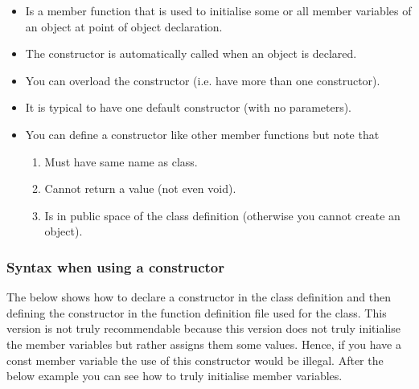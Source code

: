 \begin{itemize}
	\item Is a member function that is used to initialise some or all member variables
	of an object at point of object declaration.
	\item The constructor is automatically called when an object is declared.
	\item You can overload the constructor (i.e. have more than one constructor).
	\item It is typical to have one default constructor (with no parameters).
	\item You can define a constructor like other member functions but note that
	\begin{enumerate}
		\item Must have same name as class.
		\item Cannot return a value (not even void).
		\item Is in public space of the class definition (otherwise you cannot create
		an object).
	\end{enumerate}
\end{itemize}

\subsubsection*{Syntax when using a constructor}
The below shows how to declare a constructor in the class definition and then 
defining the constructor in the function definition file used for the class. This version
is not truly recommendable because this version does not truly initialise the member
variables but rather assigns them some values. Hence, if you have a const member variable
the use of this constructor would be illegal. After the below example you can see how to truly
initialise member variables. 



